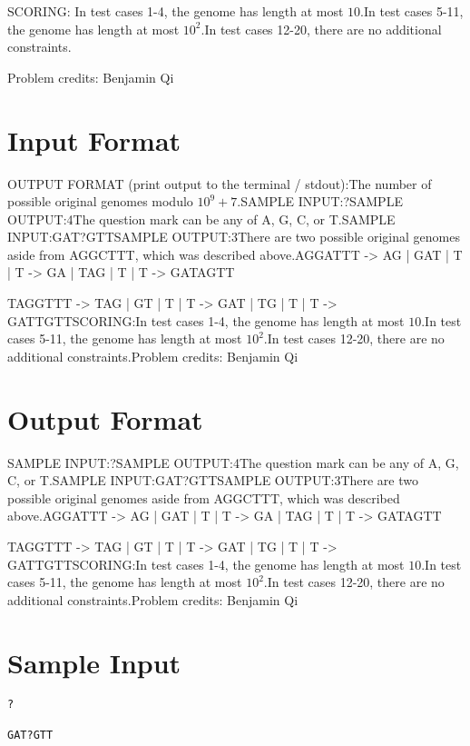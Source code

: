 \documentclass[12pt]{article}
\begin{document}
SCORING:
In test cases 1-4, the genome has length at most $10$.In test cases 5-11, the genome has length at most $10^2$.In test cases 12-20, there are no additional constraints.


Problem credits: Benjamin Qi



\section*{Input Format}
OUTPUT FORMAT (print output to the terminal / stdout):The number of possible original genomes modulo $10^9+7$.SAMPLE INPUT:?SAMPLE OUTPUT:4The question mark can be any of A, G, C, or T.SAMPLE INPUT:GAT?GTTSAMPLE OUTPUT:3There are two possible original genomes aside from AGGCTTT, which was described
above.AGGATTT -> AG | GAT | T | T -> GA | TAG | T | T -> GATAGTT

TAGGTTT -> TAG | GT | T | T -> GAT | TG | T | T -> GATTGTTSCORING:In test cases 1-4, the genome has length at most $10$.In test cases 5-11, the genome has length at most $10^2$.In test cases 12-20, there are no additional constraints.Problem credits: Benjamin Qi

\section*{Output Format}
SAMPLE INPUT:?SAMPLE OUTPUT:4The question mark can be any of A, G, C, or T.SAMPLE INPUT:GAT?GTTSAMPLE OUTPUT:3There are two possible original genomes aside from AGGCTTT, which was described
above.AGGATTT -> AG | GAT | T | T -> GA | TAG | T | T -> GATAGTT

TAGGTTT -> TAG | GT | T | T -> GAT | TG | T | T -> GATTGTTSCORING:In test cases 1-4, the genome has length at most $10$.In test cases 5-11, the genome has length at most $10^2$.In test cases 12-20, there are no additional constraints.Problem credits: Benjamin Qi

\section*{Sample Input}
\begin{verbatim}
?

GAT?GTT
\end{verbatim}
\end{document}
